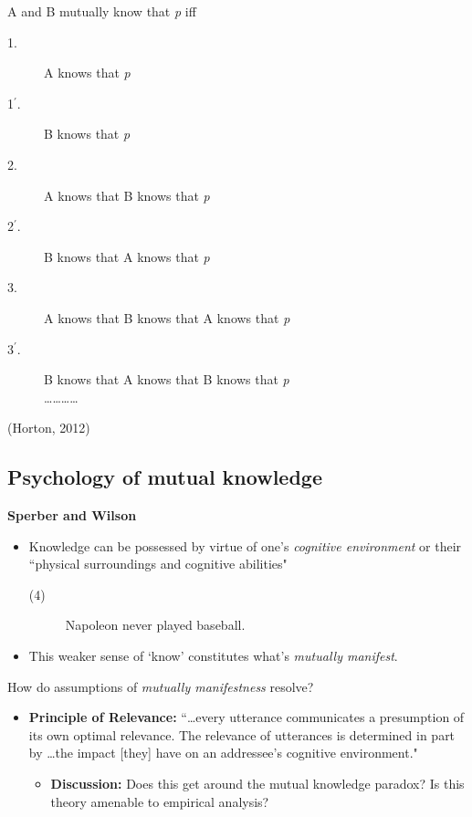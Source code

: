 \documentclass{article}
\begin{document}
\begin{multicols}{2}
A and B mutually know that \textit{p} iff \vspace{-1.5mm}
\begin{description}
	\item[1.] A knows that \textit{p}\vspace{-1.5mm}
	\item[1$^{\prime}$.] B knows that \textit{p}\vspace{-1.5mm}
	\item[2.] A knows that B knows that \textit{p}\vspace{-1.5mm}
	\item[2$^{\prime}$.] B knows that A knows that \textit{p} \vspace{-1.5mm}
	\item[3.] A knows that B knows that A knows that \textit{p} \vspace{-1.5mm}
	\item[3$^{\prime}$.] B knows that A knows that B knows that \textit{p}\vspace{-5mm}\\
	
	\hspace{6mm}\mbox{}\ldots\ldots\ldots\ldots\\
\end{description}\vspace{-2mm}
\hfill (Horton, 2012)
\subsection{Psychology of mutual knowledge}
\textbf{Sperber and Wilson}
\begin{itemize}
	\item Knowledge can be possessed by virtue of one's \textit{cognitive environment} or their \textquotedblleft physical surroundings and cognitive abilities"
	\begin{description}
		\item[(4)] Napoleon never played baseball.
	\end{description}
	\item This weaker sense of \textquoteleft know' constitutes what's \textit{mutually manifest}.
\end{itemize}

\indent How do assumptions of \textit{mutually manifestness} resolve?
\begin{itemize}
	\item \textbf{Principle of Relevance:} \textquotedblleft\dots every utterance communicates a presumption of its own optimal relevance. The relevance of utterances is determined in part by \ldots the impact [they] have on an addressee's cognitive environment."
	\begin{itemize}
		\item \textbf{Discussion:} Does this get around the mutual knowledge paradox? Is this theory amenable to empirical analysis?
	\end{itemize}
\end{itemize}\vspace{3mm}


\end{multicols}
\end{document}
